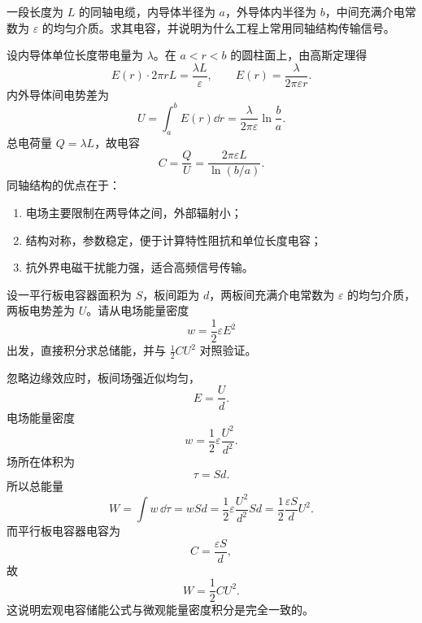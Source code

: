 \begin{university}
一段长度为 $L$ 的同轴电缆，内导体半径为 $a$，外导体内半径为 $b$，中间充满介电常数为 $\varepsilon$ 的均匀介质。求其电容，并说明为什么工程上常用同轴结构传输信号。

\begin{center}
\end{center}

\begin{solution}
设内导体单位长度带电量为 $\lambda$。在 $a<r<b$ 的圆柱面上，由高斯定理得
\[
E(r)\cdot 2\pi rL=\frac{\lambda L}{\varepsilon},
\qquad
E(r)=\frac{\lambda}{2\pi\varepsilon r}.
\]
内外导体间电势差为
\[
U=\int_a^b E(r)\dd{r}=\frac{\lambda}{2\pi\varepsilon}\ln\frac{b}{a}.
\]
总电荷量 $Q=\lambda L$，故电容
\[
C=\frac{Q}{U}=\frac{2\pi\varepsilon L}{\ln(b/a)}.
\]
同轴结构的优点在于：
\begin{enumerate}
  \item 电场主要限制在两导体之间，外部辐射小；
  \item 结构对称，参数稳定，便于计算特性阻抗和单位长度电容；
  \item 抗外界电磁干扰能力强，适合高频信号传输。
\end{enumerate}
\end{solution}
\end{university}

\begin{university}
设一平行板电容器面积为 $S$，板间距为 $d$，两板间充满介电常数为 $\varepsilon$ 的均匀介质，两板电势差为 $U$。请从电场能量密度
\[
w=\frac12\varepsilon E^2
\]
出发，直接积分求总储能，并与 $\frac12 CU^2$ 对照验证。

\begin{solution}
忽略边缘效应时，板间场强近似均匀，
\[
E=\frac{U}{d}.
\]
电场能量密度
\[
w=\frac12\varepsilon \frac{U^2}{d^2}.
\]
场所在体积为
\[
\tau=Sd.
\]
所以总能量
\[
W=\int w\,\dd{\tau}=wSd=\frac12\varepsilon \frac{U^2}{d^2}Sd
=\frac12\frac{\varepsilon S}{d}U^2.
\]
而平行板电容器电容为
\[
C=\frac{\varepsilon S}{d},
\]
故
\[
W=\frac12 CU^2.
\]
这说明宏观电容储能公式与微观能量密度积分是完全一致的。
\end{solution}
\end{university}


